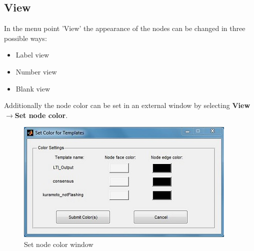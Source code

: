 \documentclass[12pt]{report}
\begin{document}
\subsection{View}
In the menu point 'View' the appearance of the nodes can be changed in three possible ways:\\
\begin{itemize}
	\item Label view
	\item Number view
	\item Blank view
\end{itemize}
Additionally the node color can be set in an external window by selecting \textbf{View$\rightarrow$Set node color}.\\
\begin{figure}[h]
\centering
\includegraphics[scale=.8]{setnodecolor}
\caption{Set node color window}
\label{FIG:abb10}
\end{figure}
\end{document}
